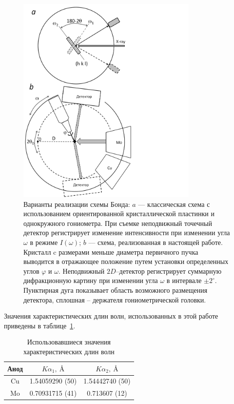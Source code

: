 \documentclass[a4paper,14pt]{extarticle}
\newcommand{\unit}[1]{ \ \text{#1}}
\newcommand{\degree}{^\circ}
\begin{document}
\begin{figure}[ht!]
    \centering
    \includegraphics[width=0.8\textwidth]{bond.png}
    \caption{Варианты реализации схемы Бонда: $a$ --- классическая схема с использованием ориентированной кристаллической пластинки и однокружного гониометра. При съемке неподвижный точечный детектор регистрирует изменение интенсивности при изменении угла $\omega$ в режиме $I(\omega)$; $b$ –-- схема, реализованная в настоящей работе. Кристалл c размерами меньше диаметра первичного пучка выводится в отражающее положение путем установки определенных углов $\varphi$ и $\omega$. Неподвижный $2D$--детектор регистрирует суммарную дифракционную картину при изменении угла $\omega$ в интервале $\pm 2\degree$. Пунктирная дуга показывает область возможного размещения детектора, сплошная – держателя гониометрической головки.}
    \label{fig:bond}
\end{figure}

Значения характеристических длин волн, использованных в этой работе приведены в таблице~\ref{tab:wavelengths}.
\begin{table}[ht!]
    \centering
    \begin{tabular}{ |c|c|c| }  
        \hline
        Анод & $K\alpha_1,\unit{\AA}$ & $K\alpha_2,\unit{\AA}$ \\
        \hline
        Cu & 1.54059290 (50) & 1.54442740 (50) \\
        Mo & 0.70931715 (41) & 0.713607 (12) \\
        \hline
    \end{tabular}
    \label{tab:wavelengths}
    \caption{Использовавшиеся значения характеристических длин волн}
\end{table}
\end{document}
